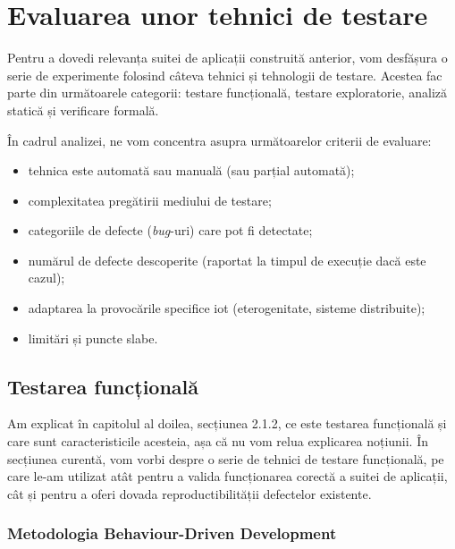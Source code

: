 \chapter{Evaluarea unor tehnici de testare}

Pentru a dovedi relevanța suitei de aplicații construită anterior, vom desfășura o serie de experimente folosind câteva tehnici și tehnologii de testare. Acestea fac parte din următoarele categorii: testare funcțională, testare exploratorie, analiză statică și verificare formală.

În cadrul analizei, ne vom concentra asupra următoarelor criterii de evaluare:

\begin{itemize}
    \item tehnica este automată sau manuală (sau parțial automată);
    \item complexitatea pregătirii mediului de testare;
    \item categoriile de defecte (\textit{bug}-uri) care pot fi detectate;
    \item numărul de defecte descoperite (raportat la timpul de execuție dacă este cazul);
    \item adaptarea la provocările specifice \acrshort{iot} (eterogenitate, sisteme distribuite);
    \item limitări și puncte slabe.
\end{itemize} 

\section{Testarea funcțională}

Am explicat în capitolul al doilea, secțiunea 2.1.2, ce este testarea funcțională și care sunt caracteristicile acesteia, așa că nu vom relua explicarea noțiunii. În secțiunea curentă, vom vorbi despre o serie de tehnici de testare funcțională, pe care le-am utilizat atât pentru a valida funcționarea corectă a suitei de aplicații, cât și pentru a oferi dovada reproductibilității defectelor existente.


\subsection*{Metodologia Behaviour-Driven Development}
\label{cap:testare_bdd}

